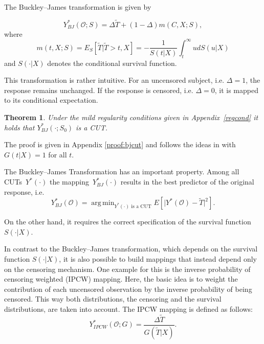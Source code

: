 \documentclass[12pt, a4paper]{scrartcl}
\theoremstyle{definition}
\theoremstyle{plain}
\newtheorem{Theorem}{Theorem}[section]
\numberwithin{equation}{section}
\numberwithin{figure}{section}
\numberwithin{table}{section}
\DeclareMathOperator*{\argmin}{arg\,min}
\begin{document}
	The Buckley--James transformation is given by
	
	\begin{equation}\label{eq:bjtrafo}
		Y_{BJ}^* (\mathcal{O}; S) = \Delta \tilde{T} + (1-\Delta)m(C,X;S),
	\end{equation}
	where
	\begin{equation}\label{eq:condmean}
		m(t,X;S) = E_S[\tilde{T} \vert \tilde T > t, X] = -\frac{1}{S(t\vert X)} \int_t^{\infty} u dS(u\vert X)
	\end{equation}%
	and $S(\cdot\vert X)$ denotes the conditional survival function.
	
	
	This transformation is rather intuitive.
	For an uncensored subject, i.e. $\Delta = 1$, the response remains unchanged.
	If the response is censored, i.e. $\Delta = 0$, it is mapped to its conditional expectation. %
	
	\begin{Theorem}\label{thm:bj}
		Under the mild regularity conditions given in Appendix~\ref{regcond} it holds that $Y_{BJ}^*(\cdot; S_0)$ is a CUT.
	\end{Theorem}
	
	The proof is given in Appendix \ref{proof:bjcut} and follows the ideas in \citet*{drcut} with $G(t\vert X)=1$ for all $t$.
	
	The Buckley--James Transformation has an important property.
	Among all CUTs~$Y^*(\cdot)$ the mapping~$Y_{BJ}^* (\cdot)$ results in the best predictor of the original response, i.e.
	\begin{equation*}
	Y_{BJ}^* (\mathcal{O})= \argmin_{\text{$Y^*(\cdot)$~is~a~CUT}} E[ \vert Y^*(\mathcal{O}) - \tilde T \vert ^2].
	\end{equation*}
	
	On the other hand, it requires the correct specification of the survival function~$S(\cdot\vert X)$.

	In contrast to the Buckley--James transformation, which depends on the survival function $S(\cdot\vert X)$, it is also possible to build mappings that instead depend only on the censoring mechanism.
	One example for this is the inverse probability of censoring weighted (IPCW) mapping.
	Here, the basic idea is to weight the contribution of each uncensored observation by the inverse probability of being censored.
	This way both distributions, the censoring and the survival distributions, are taken into account.
	The IPCW mapping is defined as follows:
	\begin{equation*}
	Y_{IPCW}^*(\mathcal{O}; G) = \frac{\Delta \tilde T}{G(\tilde T \vert X)}.
	\end{equation*}
\end{document}
